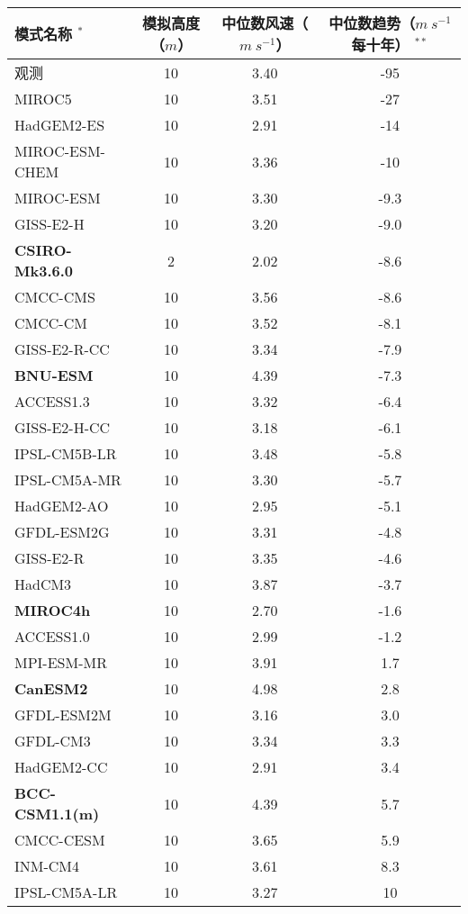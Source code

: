 \begin{table}[!htbp]
    \label{tab:GCMoutputs}
    \centering
    \small%
    \setlength{\tabcolsep}{5 pt}%
    \renewcommand{\arraystretch}{1.0}%
    \begin{tabular}{lccc}
        \hline
         模式名称  $^{*}$& 模拟高度（$m$） & 中位数风速（$m ~ s^{-1}$） & 中位数趋势（$m ~ s^{-1}$每十年） $^{**}$\\
        \hline
        观测 & 10 & 3.40 & -95 \\
        MIROC5 & 10 & 3.51 & -27 \\
        HadGEM2-ES & 10 & 2.91 & -14 \\
        MIROC-ESM-CHEM & 10 & 3.36 & -10\\
        MIROC-ESM & 10 & 3.30 & -9.3 \\
        GISS-E2-H & 10 & 3.20 & -9.0 \\
        \textbf{CSIRO-Mk3.6.0} & 2 & 2.02 & -8.6 \\
        CMCC-CMS & 10 & 3.56 & -8.6 \\
        CMCC-CM & 10 & 3.52 & -8.1 \\
        GISS-E2-R-CC & 10 & 3.34 & -7.9 \\
        \textbf{BNU-ESM} & 10 & 4.39 & -7.3 \\
        ACCESS1.3 & 10 & 3.32 & -6.4 \\
        GISS-E2-H-CC & 10 & 3.18 & -6.1 \\
        IPSL-CM5B-LR & 10 & 3.48 & -5.8 \\
        IPSL-CM5A-MR & 10 & 3.30 & -5.7 \\
        HadGEM2-AO & 10 & 2.95 & -5.1 \\
        GFDL-ESM2G & 10 & 3.31 & -4.8 \\
        GISS-E2-R & 10 & 3.35 & -4.6 \\
        HadCM3 & 10 & 3.87 & -3.7 \\
        \textbf{MIROC4h} & 10 & 2.70 & -1.6 \\
        ACCESS1.0 & 10 & 2.99 &  -1.2 \\
        MPI-ESM-MR & 10 & 3.91 & 1.7 \\
        \textbf{CanESM2} & 10 & 4.98 & 2.8 \\
        GFDL-ESM2M & 10 & 3.16 & 3.0 \\    
        GFDL-CM3 & 10 & 3.34 & 3.3 \\
        HadGEM2-CC & 10 & 2.91 & 3.4 \\
        \textbf{BCC-CSM1.1(m)} & 10 & 4.39 & 5.7 \\
        CMCC-CESM & 10 & 3.65 & 5.9 \\
        INM-CM4 & 10 & 3.61 & 8.3 \\
        IPSL-CM5A-LR & 10 & 3.27 & 10 \\
        \hline
	\end{tabular}
\end{table}
